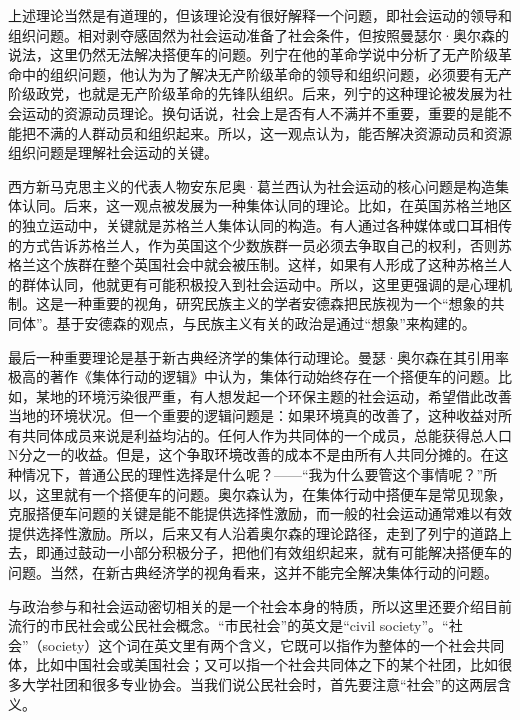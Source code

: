 {{上述理论当然是有道理的，但该理论没有很好解释一个问题，即社会运动的领导和组织问题。相对剥夺感固然为社会运动准备了社会条件，但按照曼瑟尔·奥尔森的说法，这里仍然无法解决搭便车的问题。列宁在他的革命学说中分析了无产阶级革命中的组织问题，他认为为了解决无产阶级革命的领导和组织问题，必须要有无产阶级政党，也就是无产阶级革命的先锋队组织。后来，列宁的这种理论被发展为社会运动的资源动员理论。换句话说，社会上是否有人不满并不重要，重要的是能不能把不满的人群动员和组织起来。所以，这一观点认为，能否解决资源动员和资源组织问题是理解社会运动的关键。

西方新马克思主义的代表人物安东尼奥·葛兰西认为社会运动的核心问题是构造集体认同。后来，这一观点被发展为一种集体认同的理论。比如，在英国苏格兰地区的独立运动中，关键就是苏格兰人集体认同的构造。有人通过各种媒体或口耳相传的方式告诉苏格兰人，作为英国这个少数族群一员必须去争取自己的权利，否则苏格兰这个族群在整个英国社会中就会被压制。这样，如果有人形成了这种苏格兰人的群体认同，他就更有可能积极投入到社会运动中。所以，这里更强调的是心理机制。这是一种重要的视角，研究民族主义的学者安德森把民族视为一个“想象的共同体”。基于安德森的观点，与民族主义有关的政治是通过“想象”来构建的。

最后一种重要理论是基于新古典经济学的集体行动理论。曼瑟·奥尔森在其引用率极高的著作《集体行动的逻辑》中认为，集体行动始终存在一个搭便车的问题。比如，某地的环境污染很严重，有人想发起一个环保主题的社会运动，希望借此改善当地的环境状况。但一个重要的逻辑问题是：如果环境真的改善了，这种收益对所有共同体成员来说是利益均沾的。任何人作为共同体的一个成员，总能获得总人口N分之一的收益。但是，这个争取环境改善的成本不是由所有人共同分摊的。在这种情况下，普通公民的理性选择是什么呢？——“我为什么要管这个事情呢？”所以，这里就有一个搭便车的问题。奥尔森认为，在集体行动中搭便车是常见现象，克服搭便车问题的关键是能不能提供选择性激励，而一般的社会运动通常难以有效提供选择性激励。所以，后来又有人沿着奥尔森的理论路径，走到了列宁的道路上去，即通过鼓动一小部分积极分子，把他们有效组织起来，就有可能解决搭便车的问题。当然，在新古典经济学的视角看来，这并不能完全解决集体行动的问题。


与政治参与和社会运动密切相关的是一个社会本身的特质，所以这里还要介绍目前流行的市民社会或公民社会概念。“市民社会”的英文是“civil society”。“社会”（society）这个词在英文里有两个含义，它既可以指作为整体的一个社会共同体，比如中国社会或美国社会；又可以指一个社会共同体之下的某个社团，比如很多大学社团和很多专业协会。当我们说公民社会时，首先要注意“社会”的这两层含义。

}}
